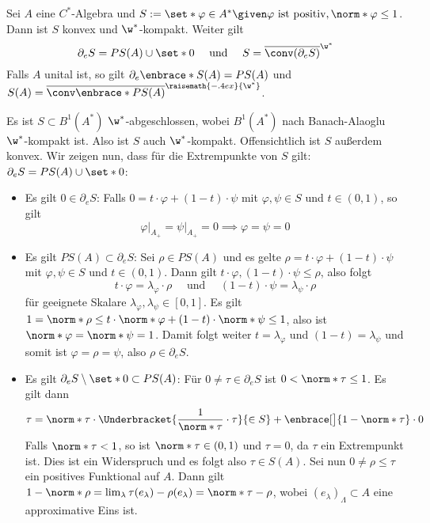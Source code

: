 \begin{satz}[label=satz:711,{name=[reine Zustände sind Extrempunkte]}]
	Sei $A$ eine $C^*$-Algebra und $S:= \set*{\varphi \in A^* \given \varphi \text{ ist positiv}, \norm*{\varphi}\le 1}$.
	Dann ist $S$ konvex und $\w^*$-kompakt. 
	Weiter gilt 
	\[
		\partial_e S = PS(A) \cup \set*{0} \quad \text{ und } \quad  S= \overline{\conv(\partial_e S)}^{\w^*}
	\]
	Falls $A$ unital ist, so gilt $\partial_e \enbrace*{S(A)} =PS(A)$ und $S(A) = \overline{\conv \enbrace*{PS(A)}}^{\raisemath{-.4ex}{\w^*}}$. 
\end{satz}
\begin{beweis}
	Es ist $S \subset B^1(A^*)$ $\w^*$-abgeschlossen, wobei $B^1(A^*)$ nach Banach-Alaoglu $\w^*$-kompakt ist.
	Also ist $S$ auch $\w^*$-kompakt. 
	Offensichtlich ist $S$ außerdem konvex.
	Wir zeigen nun, dass für die Extrempunkte von $S$ gilt: $\partial_e S = PS(A) \cup \set*{0}$:
	\begin{itemize}
		\item Es gilt $0 \in \partial_e S$:
		Falls $0=t \cdot \varphi + (1-t) \cdot \psi$ mit $\varphi,\psi \in S$ und $t \in (0,1)$, so gilt
		\[
			\varphi\big|_{A_+}\!\! = \psi\big|_{A_+}\!\!=0 \implies \varphi=\psi=0
		\]
		\item Es gilt $PS(A) \subset \partial_e S$: Sei $\rho \in PS(A)$ und es gelte $\rho = t \cdot \varphi + (1-t) \cdot \psi$ mit $\varphi,\psi \in S$ und $t \in (0,1)$.
		Dann gilt $t \cdot \varphi, (1-t) \cdot \psi\le \rho$, also folgt 
		\[
			t \cdot \varphi = \lambda_\varphi \cdot \rho \quad \text{ und }\quad  (1-t) \cdot \psi = \lambda_\psi \cdot \rho 
		\]
		für geeignete Skalare $\lambda_\varphi, \lambda_\psi \in [0,1]$.
		Es gilt $1= \norm*{\rho} \le t \cdot \norm*{\varphi} + (1-t) \cdot \norm*{\psi} \le 1$, also ist $\norm*{\varphi}=\norm*{\psi}=1$.
		Damit folgt weiter $t=\lambda_\varphi$ und $(1-t)=\lambda_\psi$ und somit ist $\varphi=\rho=\psi$, also $\rho \in \partial_e S$.
		\item Es gilt $\partial_e S \setminus \set*{0} \subset PS(A)$: Für $0\neq\tau \in \partial_e S$ ist $0<\norm*{\tau}\le1$.
		Es gilt dann
		\[
			\tau= \norm*{\tau} \cdot \Underbracket{\frac{1}{\norm*{\tau}} \cdot \tau}{\in S} + \enbrace[\big]{1- \norm*{\tau}} \cdot 0 
		\]
		Falls $\norm*{\tau}<1$, so ist $\norm*{\tau} \in (0,1)$ und $\tau=0$, da $\tau$ ein Extrempunkt ist.
		Dies ist ein Widerspruch und es folgt also $\tau \in S(A)$.
		Sei nun $0\neq \rho \le \tau$ ein positives Funktional auf $A$.
		Dann gilt $1- \norm*{\rho} = \lim_\lambda \tau(e_\lambda) - \rho(e_\lambda)= \norm*{\tau- \rho}$, wobei $(e_\lambda)_\Lambda \subset A$ eine approximative Eins ist.

\end{itemize}
\end{beweis}
